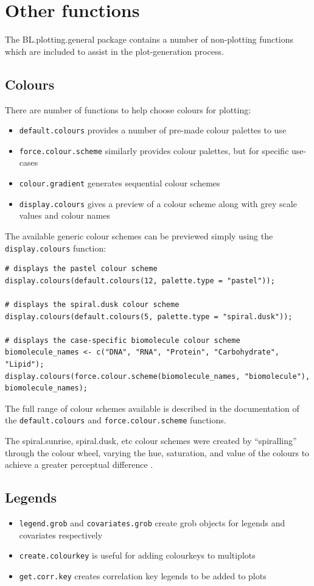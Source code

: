 \documentclass[letterpaper]{article}\usepackage[]{graphicx}\usepackage[]{color}
\begin{document}
\section{Other functions}
The BL.plotting.general package contains a number of non-plotting functions which are included to assist in the plot-generation process. 

\subsection{Colours}
There are number of functions to help choose colours for plotting:
\begin{itemize}
\item \texttt{default.colours} provides a number of pre-made colour palettes to use
\item \texttt{force.colour.scheme} similarly provides colour palettes, but for specific use-cases
\item \texttt{colour.gradient} generates sequential colour schemes
\item \texttt{display.colours} gives a preview of a colour scheme along with grey scale values and colour names
\end{itemize}

The available generic colour schemes can be previewed simply using the \verb|display.colours| function:
\begin{verbatim}
# displays the pastel colour scheme
display.colours(default.colours(12, palette.type = "pastel"));

# displays the spiral.dusk colour scheme
display.colours(default.colours(5, palette.type = "spiral.dusk"));

# displays the case-specific biomolecule colour scheme
biomolecule_names <- c("DNA", "RNA", "Protein", "Carbohydrate", "Lipid");
display.colours(force.colour.scheme(biomolecule_names, "biomolecule"), biomolecule_names);
\end{verbatim}

The full range of colour schemes available is described in the documentation of the \verb|default.colours| and \verb|force.colour.scheme| functions.

The spiral.sunrise, spiral.dusk, etc colour schemes were created by ``spiralling'' through the colour wheel, varying the hue, saturation, and value of the colours to achieve a greater perceptual difference \cite{rainbow, wong2}. 

\subsection{Legends}
\begin{itemize}
\item \texttt{legend.grob} and \texttt{covariates.grob} create grob objects for legends and covariates respectively
\item \texttt{create.colourkey} is useful for adding colourkeys to multiplots
\item \texttt{get.corr.key} creates correlation key legends to be added to plots
\end{itemize}
\end{document}
